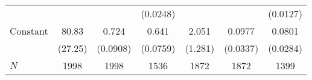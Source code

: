 {\begin{tabular}{l*{6}{c}}
            &                     &                     &    (0.0248)         &                     &                     &    (0.0127)         \\
Constant    &       80.83\sym{**} &       0.724\sym{***}&       0.641\sym{***}&       2.051         &      0.0977\sym{**} &      0.0801\sym{**} \\
            &     (27.25)         &    (0.0908)         &    (0.0759)         &     (1.281)         &    (0.0337)         &    (0.0284)         \\
\hline
\(N\)       &        1998         &        1998         &        1536         &        1872         &        1872         &        1399         \\
\hline\hline
\end{tabular}
}
